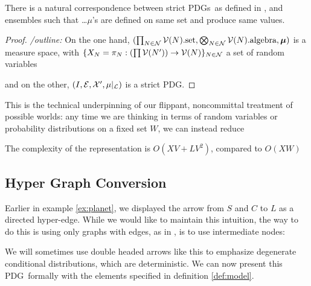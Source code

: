 \documentclass{article}
\newcommand{\bmu}{\boldsymbol{\mu}}
\newcommand{\Ed}{\mathcal E}
\newcommand{\MN}{PDG}
\newcommand{\MNs}{\MN s}
\numberwithin{equation}{section}
\begin{document}
\begin{notfocus}
	
	\begin{prop}
		There is a natural correspondence between strict \MNs\ as defined in , and ensembles such that  \ldots $\mu$'s are defined on same set and produce same values.
	\end{prop}
	\begin{proof}
		\textit{/outline:}
		On the one hand, $(\prod_{N \in \cal N} \mathcal V(N).\text{set}, \bigotimes_{N \in \cal N} \mathcal V(N).\text{algebra}, \bmu)$ is a measure space, with $\{X_N = \pi_N : \left(\prod\mathcal V(N')\right) \to  \mathcal V(N) \}_{N \in \cal N}$ a set of random variables
		
		and  on the other, $(I, \Ed, \mathcal X', \mu|_{\cal L})$ is a strict \MN.
	\end{proof}
	
	This is the technical underpinning of our flippant, noncommittal treatment of possible worlds: any time we are thinking in terms of random variables or probability distributions on a fixed set $W$, we can instead reduce
	
	
	The complexity of the representation is $O(XV + L V^2)$, compared to $O(XW)$
	
	\subsection{Hyper Graph Conversion}\label{sec:hyper-convert}
	\begin{example}[continues=ex:planet]
		Earlier in example \ref{ex:planet}, we displayed the arrow from $S$ and $C$ to $L$ as a directed hyper-edge. While we would like to maintain this intuition, the way to do this is using only graphs with edges, as in , is to use intermediate nodes:
		
		\begin{center}
		\end{center}
		We will sometimes use double headed arrows like this to emphasize degenerate conditional distributions, which are deterministic.
		We can now present this \MN\ formally with the elements specified in definition \ref{def:model}.
		

\end{example}
\end{notfocus}
\end{document}
